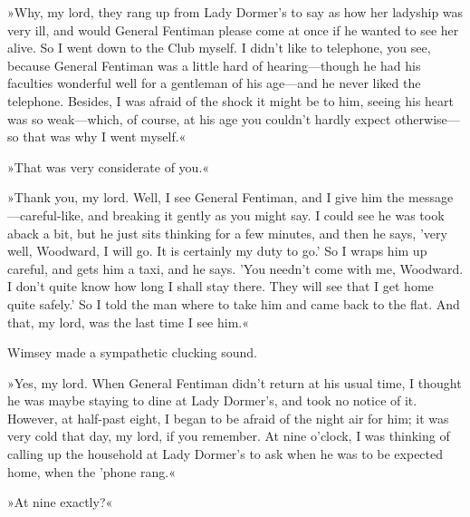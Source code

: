 »Why, my lord, they rang up from Lady Dormer's to say as how her ladyship was very ill, and would General Fentiman please come at once if he wanted to see her alive. So I went down to the Club myself. I didn't like to telephone, you see, because General Fentiman was a little hard of hearing—though he had his faculties wonderful well for a gentleman of his age—and he never liked the telephone. Besides, I was afraid of the shock it might be to him, seeing his heart was so weak—which, of course, at his age you couldn't hardly expect otherwise—so that was why I went myself.«

»That was very considerate of you.«

»Thank you, my lord. Well, I see General Fentiman, and I give him the message—careful-like, and breaking it gently as you might say. I could see he was took aback a bit, but he just sits thinking for a few minutes, and then he says, 'very well, Woodward, I will go. It is certainly my duty to go.' So I wraps him up careful, and gets him a taxi, and he says. 'You needn't come with me, Woodward. I don't quite know how long I shall stay there. They will see that I get home quite safely.' So I told the man where to take him and came back to the flat. And that, my lord, was the last time I see him.«

Wimsey made a sympathetic clucking sound.

»Yes, my lord. When General Fentiman didn't return at his usual time, I thought he was maybe staying to dine at Lady Dormer's, and took no notice of it. However, at half-past eight, I began to be afraid of the night air for him; it was very cold that day, my lord, if you remember. At nine o'clock, I was thinking of calling up the household at Lady Dormer's to ask when he was to be expected home, when the 'phone rang.«

»At nine exactly?«

